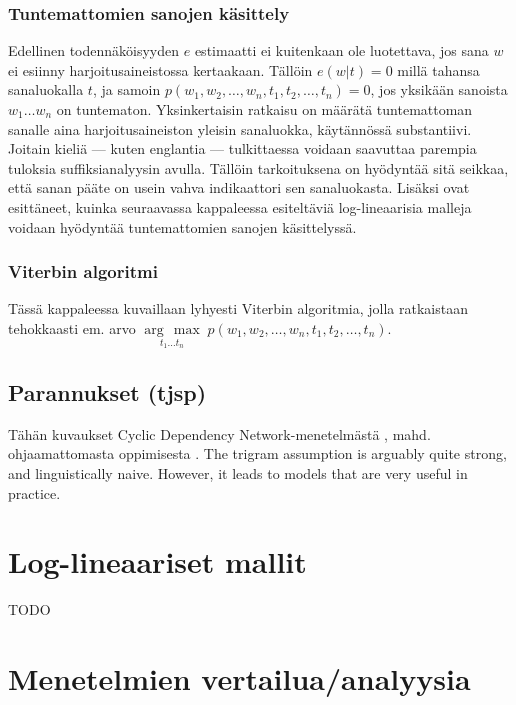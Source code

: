 \documentclass[utf8,bachelor,manualbib]{gradu3}
\newcommand{\argmax}[1]{\underset{#1}{\operatorname{arg}\,\operatorname{max}}\;}
\begin{document}
\subsection{Tuntemattomien sanojen käsittely}

Edellinen todennäköisyyden $e$ estimaatti ei kuitenkaan ole luotettava, jos sana $w$ ei esiinny harjoitusaineistossa kertaakaan. Tällöin $e(w|t)=0$ millä tahansa sanaluokalla $t$, ja samoin 
$p(w_1, w_2, \ldots, w_n, t_1, t_2, \ldots, t_n) = 0$, jos yksikään sanoista $w_1 \ldots w_n$ on tuntematon. Yksinkertaisin ratkaisu on määrätä tuntemattoman sanalle aina harjoitusaineiston yleisin sanaluokka, käytännössä substantiivi. Joitain kieliä --- kuten englantia --- tulkittaessa voidaan saavuttaa parempia tuloksia suffiksianalyysin \citep{samuelsson1993} avulla. Tällöin tarkoituksena on hyödyntää sitä seikkaa, että sanan pääte on usein vahva indikaattori sen sanaluokasta. Lisäksi \citet{toutanova2003} ovat esittäneet, kuinka seuraavassa kappaleessa esiteltäviä log-lineaarisia malleja voidaan hyödyntää tuntemattomien sanojen käsittelyssä.


\subsection{Viterbin algoritmi}

Tässä kappaleessa kuvaillaan lyhyesti Viterbin algoritmia, jolla ratkaistaan tehokkaasti em. arvo $\argmax{t_1 \ldots t_n} p(w_1, w_2, \ldots, w_n, t_1, t_2, \ldots, t_n)$.

\section{Parannukset (tjsp)}

Tähän kuvaukset Cyclic Dependency Network-menetelmästä \citep{toutanova2003}, mahd. ohjaamattomasta oppimisesta \citep{banko2004}. The trigram assumption is arguably quite strong, and linguistically naive. However, it leads to models that are very useful in
practice.


\chapter{Log-lineaariset mallit}

TODO



\chapter{Menetelmien vertailua/analyysia}
\end{document}
